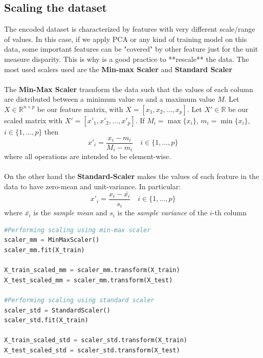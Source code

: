 \subsection{Scaling the dataset}

The encoded dataset is characterized by features with very different scale/range  of values. In this case, if we apply PCA or any kind of training model on this data, some important features can be "covered" by other feature just for the unit measure disparity. This is why is a good practice to **rescale** the data. The most used scalers used are the \textbf{Min-max Scaler} and \textbf{Standard Scaler}\\
\\
The \textbf{Min-Max Scaler} trasnform the data such that the values of each column are distributed between a minimum value $m$ and a maximum value $M$. Let $X \in \mathbb{R}^{n \times p}$ be our feature matrix, with $X=[x_1, x_2, \dots, x_p]$. Let $X' \in \mathbb{R}$ be our scaled matrix with $X'=[x'_1, x'_2, \dots, x'_p]$. If $M_i = \max\{x_i\}$, $m_i = \min\{x_i\}$, $i \in \{1,  \dots,  p\}$ then
\begin{equation}
    x'_i = \frac{x_i - m_i}{M_i-m_i} \quad i \in \{1,  \dots,  p\}    
\end{equation}
where all operations are intended to be element-wise. \\
\\
On the other hand the \textbf{Standard-Scaler} makes the values of each feature in the data to have zero-mean and unit-variance. In particular: 
\begin{equation}
    x'_i = \frac{x_i - \bar{x_i}}{s_i} \quad i \in \{1,  \dots,  p\}    
\end{equation}
where $\bar{x_i}$ is the \textit{sample mean} and $s_i$ is the \textit{sample variance} of the $i$-th column
\begin{lstlisting}[language=Python, caption= Data scaling]
#Performing scaling using min-max scaler
scaler_mm = MinMaxScaler()
scaler_mm.fit(X_train)

X_train_scaled_mm = scaler_mm.transform(X_train)
X_test_scaled_mm = scaler_mm.transform(X_test)

#Performing scaling using standard scaler
scaler_std = StandardScaler()
scaler_std.fit(X_train)

X_train_scaled_std = scaler_std.transform(X_train)
X_test_scaled_std = scaler_std.transform(X_test)
\end{lstlisting}
